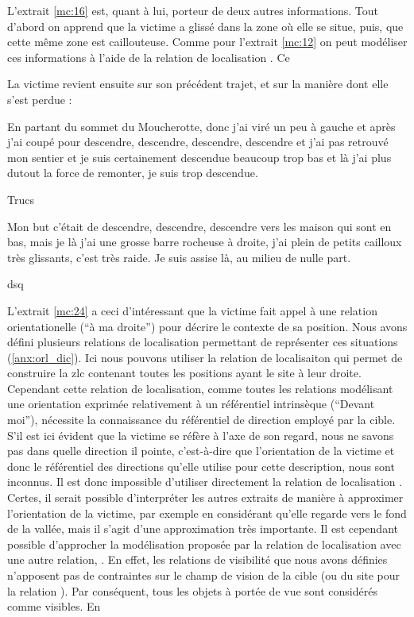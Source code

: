 L'extrait \ref{mc:16} est, quant à lui, porteur de deux autres
informations. Tout d'abord on apprend que la victime a glissé dans la
zone où elle se situe, puis, que cette même zone est
caillouteuse.
%
Comme pour l'extrait \ref{mc:12} on peut modéliser ces
informations à l'aide de la relation de localisation
. Ce 


La victime revient ensuite sur son précédent trajet, et sur la manière
dont elle s'est perdue :
%
\begin{dialogue*}
  \Req {} En partant du sommet du Moucherotte, donc j’ai
  viré un peu à gauche et  après j'ai coupé pour
   descendre, descendre, descendre, descendre et
   j’ai pas retrouvé mon sentier et 
  je suis certainement descendue beaucoup trop bas et là
   j’ai plus dutout la force de remonter, je suis trop
  descendue.
\end{dialogue*}
% 
Trucs

\begin{dialogue*}
  \Req {} Mon but c’était de descendre, descendre,
  descendre vers les maison qui sont en bas,  mais je
  là j’ai une grosse barre rocheuse à droite,  j’ai
  plein de petits cailloux très glissants,  c’est très
  raide.  Je suis assise là, au milieu de nulle part.
\end{dialogue*}
% 
dsq

L'extrait \ref{mc:24} a ceci d'intéressant que la victime fait appel à
une relation orientationelle (\enquote{à ma droite}) pour décrire le
contexte de sa position. Nous avons défini plusieurs relations de
localisation permettant de représenter ces situations
(\autoref{anx:orl_dic}). Ici nous pouvons utiliser la relation de
localisaiton  qui permet de construire
la \ac{zlc} contenant toutes les positions ayant le site à leur
droite. Cependant cette relation de localisation, comme toutes les
relations modélisant une orientation exprimée relativement à un
référentiel intrinsèque (\eg \enquote{Devant moi}), nécessite la
connaissance du référentiel de direction employé par la cible. S'il
est ici évident que la victime se réfère à l'axe de son regard, nous
ne savons pas dans quelle direction il pointe, c'est-à-dire que
l'orientation de la victime et donc le référentiel des directions
qu'elle utilise pour cette description, nous sont inconnus. Il est
donc impossible d'utiliser directement la relation de localisation
. Certes, il serait possible
d'interpréter les autres extraits de manière à approximer
l'orientation de la victime, par exemple en considérant qu'elle
regarde vers le fond de la vallée, mais il s'agit d'une approximation
très importante. Il est cependant possible d'approcher la modélisation
proposée par la relation de localisation
 avec une autre relation,
. En effet, les relations de visibilité
que nous avons définies n'apposent pas de contraintes sur le champ de
vision de la cible (ou du site pour la relation
). Par conséquent, tous les objets à
portée de vue sont considérés comme visibles.
%
En

